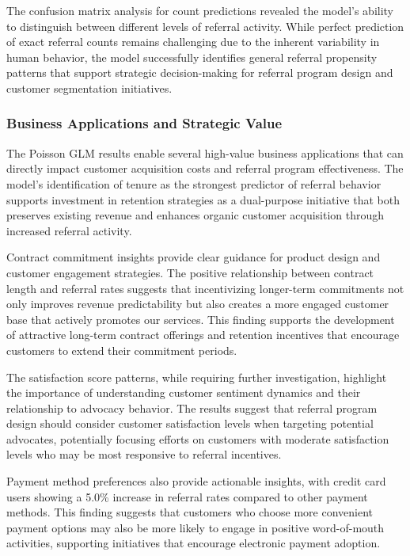 \documentclass[
]{article}
\begin{document}
The confusion matrix analysis for count predictions revealed the model's
ability to distinguish between different levels of referral activity.
While perfect prediction of exact referral counts remains challenging
due to the inherent variability in human behavior, the model
successfully identifies general referral propensity patterns that
support strategic decision-making for referral program design and
customer segmentation initiatives.

\hypertarget{business-applications-and-strategic-value}{%
\subsubsection{Business Applications and Strategic
Value}\label{business-applications-and-strategic-value}}

The Poisson GLM results enable several high-value business applications
that can directly impact customer acquisition costs and referral program
effectiveness. The model's identification of tenure as the strongest
predictor of referral behavior supports investment in retention
strategies as a dual-purpose initiative that both preserves existing
revenue and enhances organic customer acquisition through increased
referral activity.

Contract commitment insights provide clear guidance for product design
and customer engagement strategies. The positive relationship between
contract length and referral rates suggests that incentivizing
longer-term commitments not only improves revenue predictability but
also creates a more engaged customer base that actively promotes our
services. This finding supports the development of attractive long-term
contract offerings and retention incentives that encourage customers to
extend their commitment periods.

The satisfaction score patterns, while requiring further investigation,
highlight the importance of understanding customer sentiment dynamics
and their relationship to advocacy behavior. The results suggest that
referral program design should consider customer satisfaction levels
when targeting potential advocates, potentially focusing efforts on
customers with moderate satisfaction levels who may be most responsive
to referral incentives.

Payment method preferences also provide actionable insights, with credit
card users showing a 5.0\% increase in referral rates compared to other
payment methods. This finding suggests that customers who choose more
convenient payment options may also be more likely to engage in positive
word-of-mouth activities, supporting initiatives that encourage
electronic payment adoption.
\end{document}
